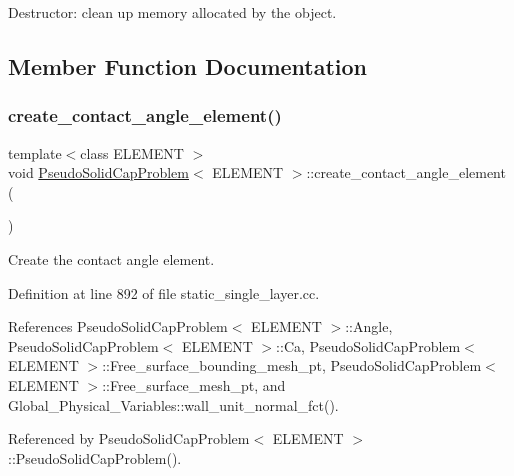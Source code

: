 Destructor\+: clean up memory allocated by the object. 



\subsection{Member Function Documentation}
\mbox{\label{classPseudoSolidCapProblem_a8f28ebf09bc66142725139291b4e21a0}} 
\subsubsection{\texorpdfstring{create\+\_\+contact\+\_\+angle\+\_\+element()}{create\_contact\_angle\_element()}\hspace{0.1cm}{\footnotesize\ttfamily [1/2]}}
{\footnotesize\ttfamily template$<$class E\+L\+E\+M\+E\+NT $>$ \\
void \hyperlink{classPseudoSolidCapProblem}{Pseudo\+Solid\+Cap\+Problem}$<$ E\+L\+E\+M\+E\+NT $>$\+::create\+\_\+contact\+\_\+angle\+\_\+element (\begin{DoxyParamCaption}{ }\end{DoxyParamCaption})\hspace{0.3cm}{\ttfamily [private]}}



Create the contact angle element. 



Definition at line 892 of file static\+\_\+single\+\_\+layer.\+cc.



References Pseudo\+Solid\+Cap\+Problem$<$ E\+L\+E\+M\+E\+N\+T $>$\+::\+Angle, Pseudo\+Solid\+Cap\+Problem$<$ E\+L\+E\+M\+E\+N\+T $>$\+::\+Ca, Pseudo\+Solid\+Cap\+Problem$<$ E\+L\+E\+M\+E\+N\+T $>$\+::\+Free\+\_\+surface\+\_\+bounding\+\_\+mesh\+\_\+pt, Pseudo\+Solid\+Cap\+Problem$<$ E\+L\+E\+M\+E\+N\+T $>$\+::\+Free\+\_\+surface\+\_\+mesh\+\_\+pt, and Global\+\_\+\+Physical\+\_\+\+Variables\+::wall\+\_\+unit\+\_\+normal\+\_\+fct().



Referenced by Pseudo\+Solid\+Cap\+Problem$<$ E\+L\+E\+M\+E\+N\+T $>$\+::\+Pseudo\+Solid\+Cap\+Problem().

